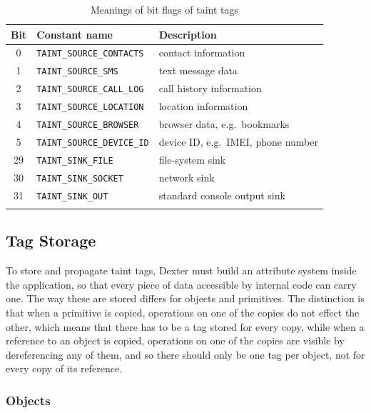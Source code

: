 \documentclass[12pt,twoside,notitlepage]{report}
\begin{document}
\begin{table}
	\begin{center}
	\begin{tabular}{|c|l|l|}
		\firsthline
		\textbf{Bit} & \textbf{Constant name}        & \textbf{Description} \\
		\hline
		0            & \verb$TAINT_SOURCE_CONTACTS$  & contact information \\
		1            & \verb$TAINT_SOURCE_SMS$       & text message data \\
		2            & \verb$TAINT_SOURCE_CALL_LOG$  & call history information \\
		3            & \verb$TAINT_SOURCE_LOCATION$  & location information \\
		4            & \verb$TAINT_SOURCE_BROWSER$   & browser data, e.g.\ bookmarks \\
		5            & \verb$TAINT_SOURCE_DEVICE_ID$ & device ID, e.g.\ IMEI, phone number \\
		\hline
		29           & \verb$TAINT_SINK_FILE$        & file-system sink \\
		30           & \verb$TAINT_SINK_SOCKET$      & network sink \\
		31           & \verb$TAINT_SINK_OUT$         & standard console output sink \\
		\lasthline
	\end{tabular}
	\end{center}
	\caption{Meanings of bit flags of taint tags}
	\label{table:TaintTagStorage_BitMeaning}
\end{table}

\subsection{Tag Storage}

To store and propagate taint tags, Dexter must build an attribute system inside the application, so that every piece of data accessible by internal code can carry one. The way these are stored differs for objects and primitives. The distinction is that when a primitive is copied, operations on one of the copies do not effect the other, which means that there has to be a tag stored for every copy, while when a reference to an object is copied, operations on one of the copies are visible by dereferencing any of them, and so there should only be one tag per object, not for every copy of its reference. 

\subsubsection{Objects}
\label{section:TaintTagStorage_Objects}
\end{document}
